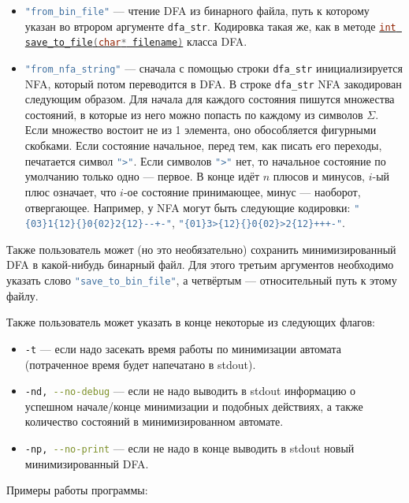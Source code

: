 \documentclass{article}
\begin{document}
\begin{itemize}
  \item[\ding{82}] \lstinline[language=bash]!"from_bin_file"! --- чтение DFA из бинарного файла, путь к которому указан во втрором аргументе \lstinline[language=C++]!dfa_str!. Кодировка такая же, как в методе \hyperlink{p2}{\lstinline[language=C++]!int save_to_file(char* filename)!} класса DFA.
  \item[\ding{82}] \lstinline[language=bash]!"from_nfa_string"! --- сначала с помощью строки \lstinline[language=bash]!dfa_str! инициализируется NFA, который потом переводится в DFA. В строке \lstinline[language=bash]!dfa_str! NFA закодирован следующим образом. Для начала для каждого состояния пишутся множества состояний, в которые из него можно попасть по каждому из символов $\Sigma$. Если множество востоит не из 1 элемента, оно обособляется фигурными скобками. Если состояние начальное, перед тем, как писать его переходы, печатается символ \lstinline[language=bash]!">"!. Если символов \lstinline[language=bash]!">"! нет, то начальное состояние по умолчанию только одно --- первое. В конце идёт $n$ плюсов и минусов, $i$-ый плюс означает, что $i$-ое состояние принимающее, минус --- наоборот, отвергающее. Например, у NFA могут быть следующие кодировки: \lstinline[language=bash]!"{03}1{12}{}0{02}2{12}--+-"!, \lstinline[language=bash]!"{01}3>{12}{}0{02}>2{12}+++-"!.
 \end{itemize}
 Также пользователь может (но это необязательно) сохранить минимизированный DFA в какой-нибудь бинарный файл. Для этого третьим аргументов необходимо указать слово \lstinline[language=bash]!"save_to_bin_file"!, а четвёртым --- относительный путь к этому файлу.

 Также пользователь может указать в конце некоторые из следующих флагов:
 \begin{itemize}
  \item[\ding{100}] \lstinline[language=bash]!-t! --- если надо засекать время работы по минимизации автомата (потраченное время будет напечатано в stdout). 
  \item[\ding{100}] \lstinline[language=bash]!-nd, --no-debug! --- если не надо выводить в stdout информацию о успешном начале/конце минимизации и подобных действиях, а также количество состояний в минимизированном автомате. 
  \item[\ding{100}] \lstinline[language=bash]!-np, --no-print! --- если не надо в конце выводить в stdout новый минимизированный DFA. 
\end{itemize}
Примеры работы программы:
\end{document}
